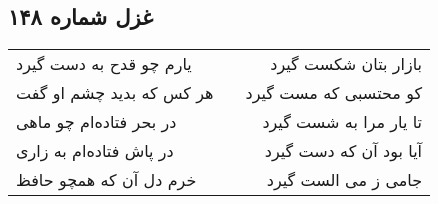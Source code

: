 \begin{center}
\section*{غزل شماره ۱۴۸}
\label{sec:sh148}
\begin{longtable}{l p{0.5cm} r}
یارم چو قدح به دست گیرد
&&
بازار بتان شکست گیرد
\\
هر کس که بدید چشم او گفت
&&
کو محتسبی که مست گیرد
\\
در بحر فتاده‌ام چو ماهی
&&
تا یار مرا به شست گیرد
\\
در پاش فتاده‌ام به زاری
&&
آیا بود آن که دست گیرد
\\
خرم دل آن که همچو حافظ
&&
جامی ز می الست گیرد
\\
\end{longtable}
\end{center}
